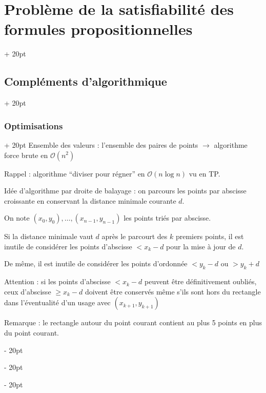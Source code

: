 \documentclass[a4paper, 12pt, twoside]{article}
\renewcommand{\ge}{\geqslant}
\newcommand{\ind}[1][20pt]{\advance\leftskip + #1}
\newcommand{\deind}[1][20pt]{\advance\leftskip - #1}
\newenvironment{indt}[2][20pt]{#2 \par \ind[#1]}{\par \deind} %
\begin{document}
\begin{indt}{\section{Problème de la satisfiabilité des formules propositionnelles}}
\begin{indt}{\subsection{Compléments d'algorithmique}}
\begin{indt}{\subsubsection{Optimisations}}
                Ensemble des valeurs : l'ensemble des paires de points $\rightarrow$ algorithme force brute en $\mathcal O(n^2)$
                
                Rappel : algorithme ``diviser pour régner'' en $\mathcal O(n\log n)$ vu en TP.
                
                Idée d'algorithme par droite de balayage : on parcours les points par abscisse croissante en conservant la distance minimale courante $d$.
                
                On note $(x_0, y_0), \ldots, (x_{n - 1}, y_{n - 1})$ les points triés par abscisse.
                
                Si la distance minimale vaut $d$ après le parcourt des $k$ premiers points, il est inutile de considérer les points d'abscisse $< x_k - d$ pour la mise à jour de $d$.
                
                De même, il est inutile de considérer les points d'ordonnée $< y_k - d$ ou $> y_k + d$
                
                \begin{center}
                \end{center}
                
                Attention : si les points d'abscisse $< x_k - d$ peuvent être définitivement oubliés, ceux d'abscisse $\ge x_k - d$ doivent être conservés même s'ils sont hors du rectangle dans l'éventualité d'un usage avec $(x_{k + 1}, y_{k + 1}                )$
                
                Remarque :
                le rectangle autour du point courant contient au plus 5 points en plus du point courant.
                
                \begin{center}
\end{center}
\end{indt}
\end{indt}
\end{indt}
\end{document}

